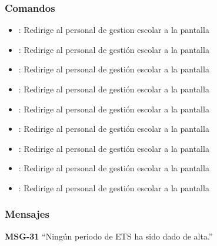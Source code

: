 \subsubsection{Comandos}
\begin{itemize}
    \item {}: Redirige al personal de gestion escolar a la pantalla 
    
    \item {}: Redirige al personal de gestión escolar a la pantalla 
    \item {}: Redirige al personal de gestión escolar a la pantalla 
    
    \item {}: Redirige al personal de gestión escolar a la pantalla 
    \item {}: Redirige al personal de gestión escolar a la pantalla 
    
    \item {}: Redirige al personal de gestión escolar a la pantalla 
    \item {}: Redirige al personal de gestión escolar a la pantalla 
    
    \item {}: Redirige al personal de gestión escolar a la pantalla 
    \item {}: Redirige al personal de gestión escolar a la pantalla 
\end{itemize}

\subsubsection{Mensajes}

\begin{Citemize}
    \item {\bf MSG-31}  ``Ningún periodo de ETS ha sido dado de alta.''
\end{Citemize}


